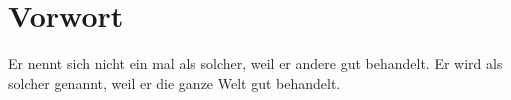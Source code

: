 \chapter*{Vorwort}



 Er nennt sich nicht ein mal als solcher, weil  er andere gut behandelt.
 Er wird als solcher genannt, weil er die ganze Welt gut behandelt.\\ \\

